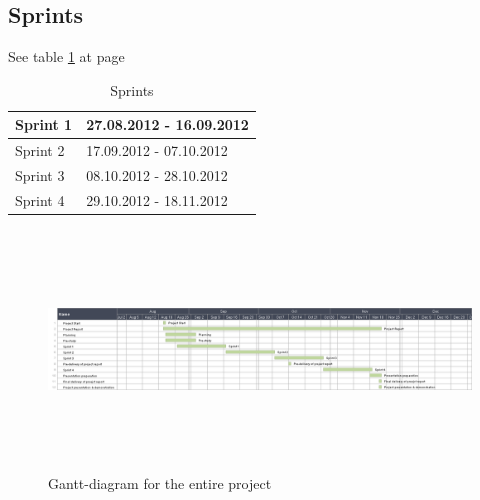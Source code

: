 \subsection*{Sprints}
See table \ref{tab:sprints} at page \pageref{tab:sprints}
\begin{table}
\begin{tabular}{l|l}
Sprint 1 &  27.08.2012 - 16.09.2012\\ \hline
Sprint 2 & 17.09.2012 - 07.10.2012\\ \hline
Sprint 3 & 08.10.2012 - 28.10.2012\\ \hline
Sprint 4 & 29.10.2012 - 18.11.2012
\end{tabular}
\caption{Sprints} \label{tab:sprints}
\end{table}

\begin{figure}[htb]
\begin{center}
\includegraphics[width=\textwidth, height=2.5in]{foo}
\caption{Gantt-diagram for the entire project}
\end{center}
\end{figure}